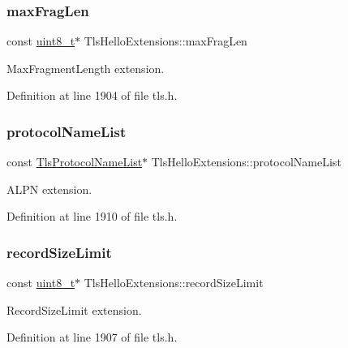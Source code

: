 \subsubsection{\texorpdfstring{max\+Frag\+Len}{maxFragLen}}
{\footnotesize\ttfamily const \hyperlink{stdint_8h_aba7bc1797add20fe3efdf37ced1182c5}{uint8\+\_\+t}$\ast$ Tls\+Hello\+Extensions\+::max\+Frag\+Len}



Max\+Fragment\+Length extension. 



Definition at line 1904 of file tls.\+h.

\mbox{\label{structTlsHelloExtensions_a0752d52c09a933f5b001385db60159b1}} 
\subsubsection{\texorpdfstring{protocol\+Name\+List}{protocolNameList}}
{\footnotesize\ttfamily const \hyperlink{tls_8h_a437df336a6795a38ec9bcfb7c2ab4b2f}{Tls\+Protocol\+Name\+List}$\ast$ Tls\+Hello\+Extensions\+::protocol\+Name\+List}



A\+L\+PN extension. 



Definition at line 1910 of file tls.\+h.

\mbox{\label{structTlsHelloExtensions_a35167138c60de81d1635fc1d87fc3b8f}} 
\subsubsection{\texorpdfstring{record\+Size\+Limit}{recordSizeLimit}}
{\footnotesize\ttfamily const \hyperlink{stdint_8h_aba7bc1797add20fe3efdf37ced1182c5}{uint8\+\_\+t}$\ast$ Tls\+Hello\+Extensions\+::record\+Size\+Limit}



Record\+Size\+Limit extension. 



Definition at line 1907 of file tls.\+h.

